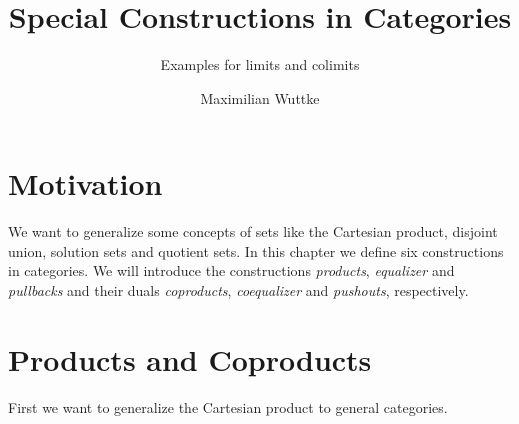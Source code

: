\def\pathToRoot{../../}

\usepackage{todonotes}

\newcommand{\catA}[0]{\cat{A}}
\newcommand{\catB}[0]{\cat{B}}
\newcommand{\fbar}[0]{\bar{f}}
\newcommand{\ftilde}[0]{\tilde{f}}
\newcommand{\gbar}[0]{\bar{g}}
\newcommand{\gtilde}[0]{\tilde{g}}
\newcommand{\dunion}[0]{\sqcup}
\newcommand{\bigdunion}[0]{\bigsqcup}
\renewcommand{\demph}[1]{\emph{#1}} %

\newcommand{\setCon}[1]{\bigl \{ #1 \bigr \}}
\newcommand{\setMap}[2]{\setCon{#1 \,\big|\, #2}}
\newcommand{\pair}[2]{\left( #1 , #2 \right)}
\newcommand{\class}[1]{\left[ #1 \right]}
\newcommand{\choice}[1]{\left< #1 \right>}
\newcommand{\explainRel}[2]{\stackrel{\text{#1}}{#2}}

\newtheorem{definition}{Definition}
\newtheorem{example}{Example}
\newtheorem{lemma}{Lemma}

\title{Special Constructions in Categories}
\subtitle{Examples for limits and colimits}

\author{Maximilian Wuttke}



\maketitle

\section*{Motivation}
We want to generalize some concepts of sets like the Cartesian product, disjoint union, solution sets and quotient sets.
In this chapter we define six constructions in categories.
We will introduce the constructions \emph{products}, \emph{equalizer} and \emph{pullbacks} and their duals
\emph{coproducts}, \emph{coequalizer} and \emph{pushouts}, respectively.

\section*{Products and Coproducts}

First we want to generalize the Cartesian product to general categories.


